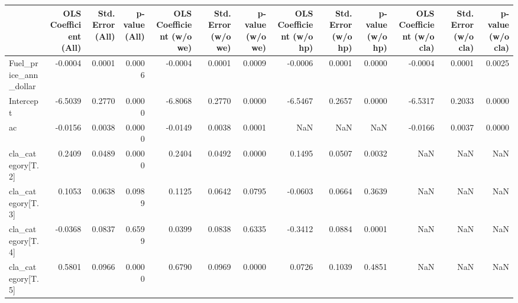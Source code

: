 \begin{tabular}{lrrrrrrrrrrrr}
\toprule
{} &  OLS Coefficient (All) &  Std. Error (All) &  p-value (All) &  OLS Coefficient (w/o we) &  Std. Error (w/o we) &  p-value (w/o we) &  OLS Coefficient (w/o hp) &  Std. Error (w/o hp) &  p-value (w/o hp) &  OLS Coefficient (w/o cla) &  Std. Error (w/o cla) &  p-value (w/o cla) \\
\midrule
Fuel\_price\_ann\_dollar &                -0.0004 &            0.0001 &         0.0006 &                   -0.0004 &               0.0001 &            0.0009 &                   -0.0006 &               0.0001 &            0.0000 &                    -0.0004 &                0.0001 &             0.0025 \\
Intercept             &                -6.5039 &            0.2770 &         0.0000 &                   -6.8068 &               0.2770 &            0.0000 &                   -6.5467 &               0.2657 &            0.0000 &                    -6.5317 &                0.2033 &             0.0000 \\
ac                    &                -0.0156 &            0.0038 &         0.0000 &                   -0.0149 &               0.0038 &            0.0001 &                       NaN &                  NaN &               NaN &                    -0.0166 &                0.0037 &             0.0000 \\
cla\_category[T.2]     &                 0.2409 &            0.0489 &         0.0000 &                    0.2404 &               0.0492 &            0.0000 &                    0.1495 &               0.0507 &            0.0032 &                        NaN &                   NaN &                NaN \\
cla\_category[T.3]     &                 0.1053 &            0.0638 &         0.0989 &                    0.1125 &               0.0642 &            0.0795 &                   -0.0603 &               0.0664 &            0.3639 &                        NaN &                   NaN &                NaN \\
cla\_category[T.4]     &                -0.0368 &            0.0837 &         0.6599 &                    0.0399 &               0.0838 &            0.6335 &                   -0.3412 &               0.0884 &            0.0001 &                        NaN &                   NaN &                NaN \\
cla\_category[T.5]     &                 0.5801 &            0.0966 &         0.0000 &                    0.6790 &               0.0969 &            0.0000 &                    0.0726 &               0.1039 &            0.4851 &                        NaN &                   NaN &                NaN \\

\end{tabular}
